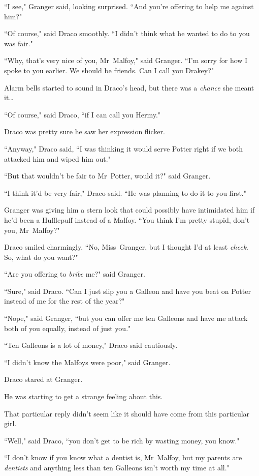 ``I see," Granger said, looking surprised. ``And you're offering to help me against him?"

``Of course," said Draco smoothly. ``I didn't think what he wanted to do to you was fair."

``Why, that's very nice of you, Mr~Malfoy," said Granger. ``I'm sorry for how I spoke to you earlier. We should be friends. Can I call you Drakey?"

Alarm bells started to sound in Draco's head, but there was a \emph{chance} she meant it{\ldots}

``Of course," said Draco, ``if I can call you Hermy."

Draco was pretty sure he saw her expression flicker.

``Anyway," Draco said, ``I was thinking it would serve Potter right if we both attacked him and wiped him out."

``But that wouldn't be fair to Mr~Potter, would it?" said Granger.

``I think it'd be very fair," Draco said. ``He was planning to do it to you first."

Granger was giving him a stern look that could possibly have intimidated him if he'd been a Hufflepuff instead of a Malfoy. ``You think I'm pretty stupid, don't you, Mr~Malfoy?"

Draco smiled charmingly. ``No, Miss~Granger, but I thought I'd at least \emph{check}. So, what do you want?"

``Are you offering to \emph{bribe} me?" said Granger.

``Sure," said Draco. ``Can I just slip you a Galleon and have you beat on Potter instead of me for the rest of the year?"

``Nope," said Granger, ``but you can offer me ten Galleons and have me attack both of you equally, instead of just you."

``Ten Galleons is a lot of money," Draco said cautiously.

``I didn't know the Malfoys were poor," said Granger.

Draco stared at Granger.

He was starting to get a strange feeling about this.

That particular reply didn't seem like it should have come from this particular girl.

``Well," said Draco, ``you don't get to be rich by wasting money, you know."

``I don't know if you know what a dentist is, Mr~Malfoy, but my parents are \emph{dentists} and anything less than ten Galleons isn't worth my time at all."


